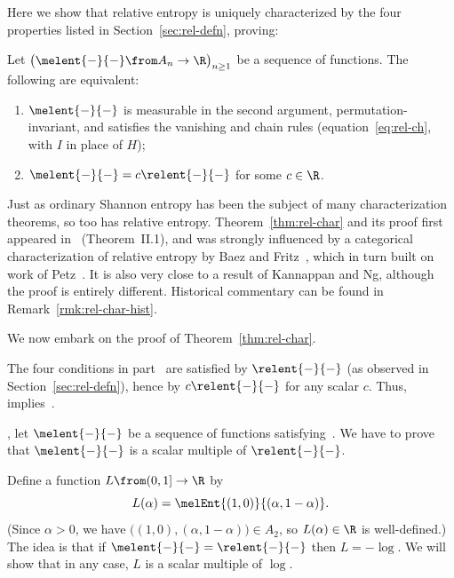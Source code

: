 Here we show that relative entropy is uniquely characterized by the four
properties listed in Section~\ref{sec:rel-defn}, proving:
% 
\begin{thm}
% 
Let $\bigl(\melent{-}{-} \from A_n \to \R\bigr)_{n \geq 1}$ be a sequence
of functions.  The following are equivalent:
% 
\begin{enumerate}
\item 
{}
$\melent{-}{-}$ is measurable in the second argument,
permutation-invariant, and satisfies the vanishing and chain rules
(equation~\eqref{eq:rel-ch}, with $I$ in place of $H$);

\item
{}
$\melent{-}{-} = c\relent{-}{-}$ for some $c \in \R$.
\end{enumerate}
\end{thm}

Just as ordinary Shannon entropy has been the subject of many
characterization theorems, so too has relative entropy.
Theorem~\ref{thm:rel-char} and its proof first appeared in~\cite{SCRE}
(Theorem~II.1), and was strongly influenced by a categorical
characterization of relative entropy by Baez%
%
%
and
Fritz~\cite{BaFr},%
%
%
which in turn built on work of Petz~\cite{Petz}.  It is also very close to
a result of Kannappan and Ng, although the proof is entirely different.
Historical commentary can be found in Remark~\ref{rmk:rel-char-hist}.

We now embark on the proof of Theorem~\ref{thm:rel-char}.

The four conditions in part~ are satisfied by
$\relent{-}{-}$ (as observed in Section~\ref{sec:rel-defn}), hence by
$c\relent{-}{-}$ for any scalar $c$.  Thus, 
implies~.

, let $\melent{-}{-}$ be a sequence of
functions satisfying~.  We have to prove that
$\melent{-}{-}$ is a scalar multiple of $\relent{-}{-}$.

Define a function $L \from (0, 1] \to \R$ by
\[
L(\alpha) = \melEnt{(1, 0)}{(\alpha, 1 - \alpha)}.
\]
(Since $\alpha > 0$, we have $\bigl((1, 0), (\alpha, 1 - \alpha)\bigr) \in
A_2$, so $L(\alpha) \in \R$ is well-defined.)  The idea is that if
$\melent{-}{-} = \relent{-}{-}$ then $L = -\log$. We will show that in
any case, $L$ is a scalar multiple of $\log$.

